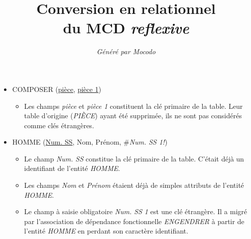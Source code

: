 \documentclass[a4paper]{article}
\title{Conversion en relationnel\\du MCD \emph{reflexive}}
\author{\emph{Généré par Mocodo}}
\newcommand{\relat}[1]{\textsc{#1}}
\newcommand{\attr}[1]{#1}
\newcommand{\prim}[1]{\uline{#1}}
\newcommand{\foreign}[1]{\#\textsl{#1}}
\begin{document}
\maketitle

\begin{itemize}
  \item \relat{COMPOSER} (\prim{pièce}, \prim{pièce 1})
  \begin{itemize}
    \item Les champs \emph{pièce} et \emph{pièce 1} constituent la clé primaire de la table. Leur table d'origine (\emph{PIÈCE}) ayant été supprimée, ils ne sont pas considérés comme clés étrangères.
  \end{itemize}

  \item \relat{HOMME} (\prim{Num. SS}, \attr{Nom}, \attr{Prénom}, \foreign{Num. SS 1!})
  \begin{itemize}
    \item Le champ \emph{Num. SS} constitue la clé primaire de la table. C'était déjà un identifiant de l'entité \emph{HOMME}.
    \item Les champs \emph{Nom} et \emph{Prénom} étaient déjà de simples attributs de l'entité \emph{HOMME}.
    \item Le champ à saisie obligatoire \emph{Num. SS 1} est une clé étrangère. Il a migré par l'association de dépendance fonctionnelle \emph{ENGENDRER} à partir de l'entité \emph{HOMME} en perdant son caractère identifiant.
  \end{itemize}

\end{itemize}
\end{document}
